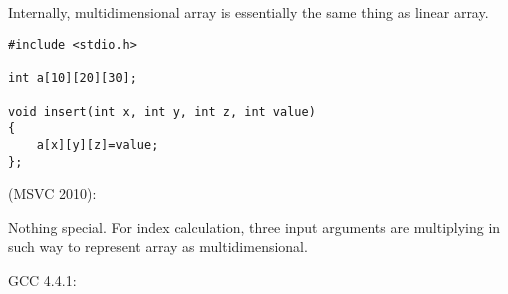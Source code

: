 ﻿\subsection{}

{Internally, multidimensional array is essentially the same thing as linear array.}


\begin{lstlisting}
#include <stdio.h>

int a[10][20][30];

void insert(int x, int y, int z, int value)
{
	a[x][y][z]=value;
};
\end{lstlisting}

 (MSVC 2010):



{Nothing special. For index calculation, three input arguments are multiplying 
in such way to represent array as multidimensional.}

GCC 4.4.1:


